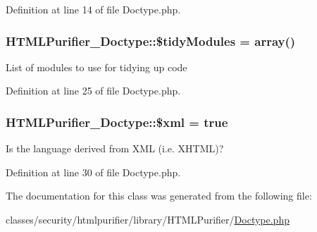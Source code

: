 Definition at line 14 of file Doctype.\+php.

\hypertarget{classHTMLPurifier__Doctype_a68201521e368ad87fb91c656a46fc993}{
\subsubsection[{\$tidy\+Modules}]{\setlength{\rightskip}{0pt plus 5cm}H\+T\+M\+L\+Purifier\+\_\+\+Doctype\+::\$tidy\+Modules = array()}}\label{classHTMLPurifier__Doctype_a68201521e368ad87fb91c656a46fc993}
List of modules to use for tidying up code 

Definition at line 25 of file Doctype.\+php.

\hypertarget{classHTMLPurifier__Doctype_aceb157000dffa2942914fdf1de8bf920}{
\subsubsection[{\$xml}]{\setlength{\rightskip}{0pt plus 5cm}H\+T\+M\+L\+Purifier\+\_\+\+Doctype\+::\$xml = true}}\label{classHTMLPurifier__Doctype_aceb157000dffa2942914fdf1de8bf920}
Is the language derived from X\+M\+L (i.\+e. X\+H\+T\+M\+L)? 

Definition at line 30 of file Doctype.\+php.



The documentation for this class was generated from the following file\+:\begin{DoxyCompactItemize}
\item 
classes/security/htmlpurifier/library/\+H\+T\+M\+L\+Purifier/\hyperlink{Doctype_8php}{Doctype.\+php}\end{DoxyCompactItemize}
